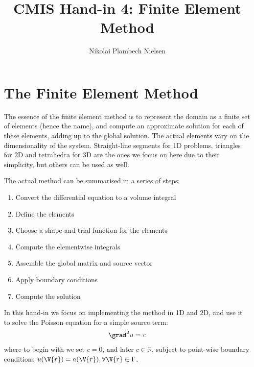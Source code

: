 \documentclass[sigconf]{acmart}
\begin{document}
%
\title{CMIS Hand-in 4: Finite Element Method}

\author{Nikolai Plambech Nielsen}


\maketitle

\section{The Finite Element Method}
The essence of the finite element method is to represent the domain as a finite set of elements (hence the name), and compute an approximate solution for each of these elements, adding up to the global solution. The actual elements vary on the dimensionality of the system. Straight-line segments for 1D problems, triangles for 2D and tetrahedra for 3D are the ones we focus on here due to their simplicity, but others can be used as well.

The actual method can be summarised in a series of steps:
\begin{enumerate}
	\item Convert the differential equation to a volume integral
	\item Define the elements
	\item Choose a shape and trial function for the elements
	\item Compute the elementwise integrals
	\item Assemble the global matrix and source vector
	\item Apply boundary conditions
	\item Compute the solution
\end{enumerate}
In this hand-in we focus on implementing the method in 1D and 2D, and use it to solve the Poisson equation for a simple source term:
\begin{equation}\label{key}
	\grad^2 u = c
\end{equation}
where to begin with we set $ c=0 $, and later $ c\in \mathbb{R} $, subject to point-wise boundary conditions $ u(\V{r}) = a(\V{r}) , \forall \V{r} \in \Gamma $.
\end{document}
